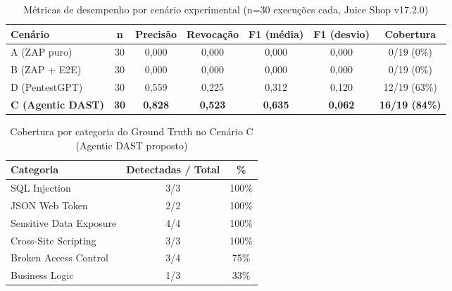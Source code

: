 
\begin{table}[htbp]
\centering
\caption{Métricas de desempenho por cenário experimental (n=30 execuções cada, Juice Shop v17.2.0)}
\label{tab:metricas-agregadas}
\begin{tabular}{lcccccc}
\toprule
\textbf{Cenário} & \textbf{n} & \textbf{Precisão} & \textbf{Revocação} & \textbf{F1 (média)} & \textbf{F1 (desvio)} & \textbf{Cobertura} \\
\midrule
A (ZAP puro) & 30 & 0,000 & 0,000 & 0,000 & 0,000 & 0/19 (0\%) \\
B (ZAP + E2E) & 30 & 0,000 & 0,000 & 0,000 & 0,000 & 0/19 (0\%) \\
D (PentestGPT) & 30 & 0,559 & 0,225 & 0,312 & 0,120 & 12/19 (63\%) \\
\textbf{C (Agentic DAST)} & \textbf{30} & \textbf{0,828} & \textbf{0,523} & \textbf{0,635} & \textbf{0,062} & \textbf{16/19 (84\%)} \\
\bottomrule
\end{tabular}
\end{table}

\begin{table}[htbp]
\centering
\caption{Cobertura por categoria do Ground Truth no Cenário C (Agentic DAST proposto)}
\label{tab:cobertura-categoria-c}
\begin{tabular}{lcc}
\toprule
\textbf{Categoria} & \textbf{Detectadas / Total} & \textbf{\%} \\
\midrule
SQL Injection & 3/3 & 100\% \\
JSON Web Token & 2/2 & 100\% \\
Sensitive Data Exposure & 4/4 & 100\% \\
Cross-Site Scripting & 3/3 & 100\% \\
Broken Access Control & 3/4 & 75\% \\
Business Logic & 1/3 & 33\% \\
\bottomrule
\end{tabular}
\end{table}

